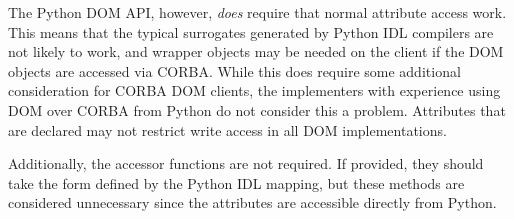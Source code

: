 The Python DOM API, however, \emph{does} require that normal attribute
access work.  This means that the typical surrogates generated by
Python IDL compilers are not likely to work, and wrapper objects may
be needed on the client if the DOM objects are accessed via CORBA.
While this does require some additional consideration for CORBA DOM
clients, the implementers with experience using DOM over CORBA from
Python do not consider this a problem.  Attributes that are declared
 may not restrict write access in all DOM
implementations.

Additionally, the accessor functions are not required.  If provided,
they should take the form defined by the Python IDL mapping, but
these methods are considered unnecessary since the attributes are
accessible directly from Python.
